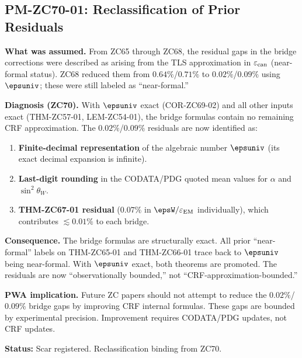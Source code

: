 \documentclass[12pt, a4paper]{article}
\renewcommand{\epsEM}{\varepsilon_{\rm EM}}
\renewcommand{\epscan}{\varepsilon_{\rm can}}
\renewcommand{\swsq}{\sin^2\!\theta_W}
\begin{document}
\subsection{PM-ZC70-01: Reclassification of Prior Residuals}
\label{sec:pm01}

\begin{derivedbox}[title={PM-ZC70-01: Residual Reclassification ---
  Approximation Error $\to$ Observational Precision (Failure Stance)}]

\textbf{What was assumed.}
From ZC65 through ZC68, the residual gaps in the bridge
corrections were described as arising from the TLS
approximation in $\epscan$ (near-formal status).
ZC68 reduced them from $0.64\%$/$0.71\%$ to $0.02\%$/$0.09\%$
using $\epsuniv$; these were still labeled as ``near-formal.''

\textbf{Diagnosis (ZC70).}
With $\epsuniv$ exact (COR-ZC69-02) and all other inputs
exact (THM-ZC57-01, LEM-ZC54-01), the bridge formulas
contain no remaining CRF approximation.
The $0.02\%$/$0.09\%$ residuals are now identified as:
\begin{enumerate}[leftmargin=2em, noitemsep]
  \item \textbf{Finite-decimal representation} of the
    algebraic number $\epsuniv$ (its exact decimal
    expansion is infinite).
  \item \textbf{Last-digit rounding} in the CODATA/PDG
    quoted mean values for $\alpha$ and $\swsq$.
  \item \textbf{THM-ZC67-01 residual} ($0.07\%$ in
    $\epsW/\epsEM$ individually), which contributes
    $\lesssim 0.01\%$ to each bridge.
\end{enumerate}

\textbf{Consequence.}
The bridge formulas are structurally exact.
All prior ``near-formal'' labels on THM-ZC65-01 and
THM-ZC66-01 trace back to $\epsuniv$ being near-formal.
With $\epsuniv$ exact, both theorems are promoted.
The residuals are now ``observationally bounded,'' not
``CRF-approximation-bounded.''

\textbf{PWA implication.}
Future ZC papers should not attempt to reduce the
$0.02\%$/$0.09\%$ bridge gaps by improving CRF internal
formulas. These gaps are bounded by experimental precision.
Improvement requires CODATA/PDG updates, not CRF updates.

\textbf{Status:} Scar registered. Reclassification binding from ZC70.
\end{derivedbox}
\end{document}
